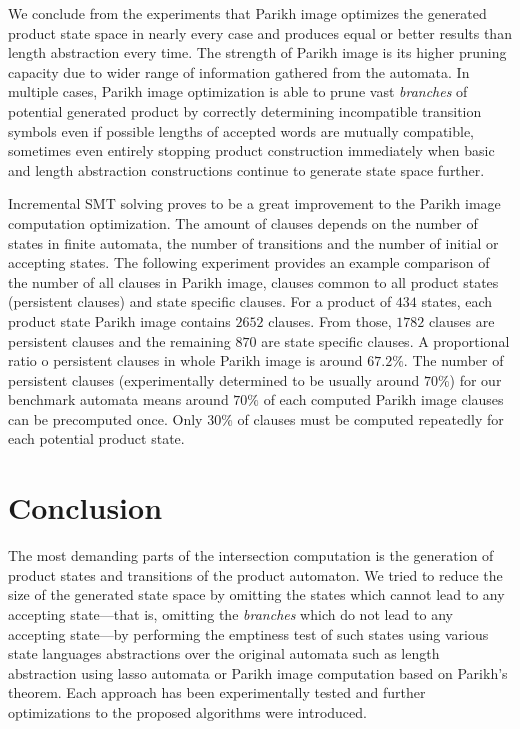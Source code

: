 
We conclude from the experiments that Parikh image optimizes the generated product state space in nearly every case and produces equal or better results than length abstraction every time. The strength of Parikh image is its higher pruning capacity due to wider range of information gathered from the automata. In multiple cases, Parikh image optimization is able to prune vast \emph{branches} of potential generated product by correctly determining incompatible transition symbols even if possible lengths of accepted words are mutually compatible, sometimes even entirely stopping product construction immediately when basic and length abstraction constructions continue to generate state space further.

Incremental SMT solving proves to be a great improvement to the Parikh image computation optimization. The amount of clauses depends on the number of states in finite automata, the number of transitions and the number of initial or accepting states. The following experiment provides an example comparison of the number of all clauses in Parikh image, clauses common to all product states (persistent clauses) and state specific clauses. For a product of $434$ states, each product state Parikh image contains $2652$ clauses. From those, $1782$ clauses are persistent clauses and the remaining $870$ are state specific clauses. A proportional ratio o persistent clauses in whole Parikh image is around $67.2 \%$. The number of persistent clauses (experimentally determined to be usually around $70 \%$) for our benchmark automata means around $70\%$ of each computed Parikh image clauses can be precomputed once. Only $30\%$ of clauses must be computed repeatedly for each potential product state.

\chapter{Conclusion}

The most demanding parts of the intersection computation is the generation of product states and transitions of the product automaton. We tried to reduce the size of the generated state space by omitting the states which cannot lead to any accepting state---that is, omitting the \textit{branches} which do not lead to any accepting state---by performing the emptiness test of such states using various state languages abstractions over the original automata such as length abstraction using lasso automata or Parikh image computation based on Parikh's theorem. Each approach has been experimentally tested and further optimizations to the proposed algorithms were introduced.

